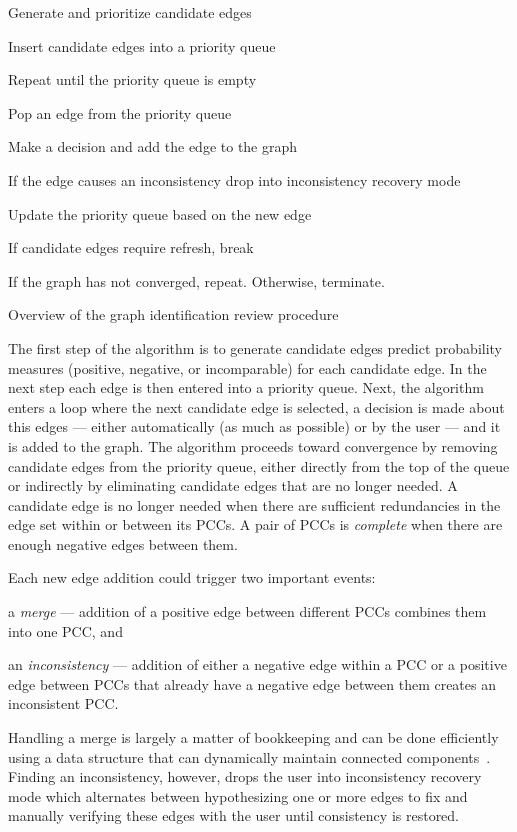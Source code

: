 \begin{algorithm}
    \begin{enumln}
    \item Generate and prioritize candidate edges 
    \item Insert candidate edges into a priority queue 
    \item Repeat until the priority queue is empty
    \begin{enumln}
        \item Pop an edge from the priority queue
        \item Make a decision and add the edge to the graph
        \item If the edge causes an inconsistency drop into inconsistency recovery mode
        \item Update the priority queue based on the new edge
        \item If candidate edges require refresh, break
    \end{enumln}
    \item If the graph has not converged, repeat. Otherwise, terminate.
    \end{enumln}
\caption[Algorithm Overview]{Overview of the graph identification review procedure}
\label{alg:AlgoOverview}
\end{algorithm}

The first step of the algorithm is to generate candidate edges predict probability measures (positive, negative,
  or incomparable) for each candidate edge.
In the next step each edge is then entered into a priority queue.
Next, the algorithm enters a loop where the next candidate edge is selected, a decision is made about this edges
  --- either automatically (as much as possible) or by the user --- and it is added to the graph.
The algorithm proceeds toward convergence by removing candidate edges from the priority queue, either directly
  from the top of the queue or indirectly by eliminating candidate edges that are no longer needed.
A candidate edge is no longer needed when there are sufficient redundancies in the edge set within or between its
  PCCs.
A pair of PCCs is \emph{complete} when there are enough negative edges between them.

Each new edge addition could trigger two important events:
\begin{enumin}
    \item a \emph{merge} --- addition of a positive edge between different
      PCCs combines them into one PCC, and

    \item an \emph{inconsistency} --- addition of either a negative edge within a PCC or a positive edge between
      PCCs that already have a negative edge between them creates an inconsistent PCC.
\end{enumin}
Handling a merge is largely a matter of bookkeeping and can be done efficiently using a data structure that can
  dynamically maintain connected components~\cite{jacob_holm_poly_logarithmic_1998}.
Finding an inconsistency, however, drops the user into inconsistency recovery mode which alternates between
  hypothesizing one or more edges to fix and manually verifying these edges with the user until consistency is
  restored.


